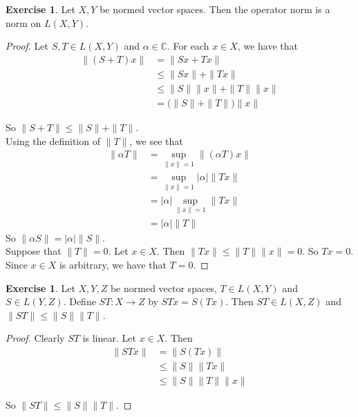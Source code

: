 \documentclass[12pt]{amsart}
\theoremstyle{definition}
\newtheorem{ex}[definition]{Exercise}
\newcommand{\al}{\alpha}
\newcommand{\C}{\mathbb{C}}
\newcommand{\lex}[1]{\label{ex:#1}}
\begin{document}
	\begin{ex} \lex{42008}
		Let $X, Y$ be normed vector spaces. Then the operator norm is a norm on $L(X,Y)$.
	\end{ex}
	
	\begin{proof}
		Let $S,T \in L(X,Y)$ and $\al \in \C$. For each $x \in X$, we have that 
		\begin{align*}
			\|(S+T)x \|
			&= \|Sx+Tx \|\\
			& \leq \|Sx \|+ \|Tx \|\\
			&\leq \|S \|\|x \|+ \|T \|\|x \|\\
			&= \big(\|S \|+ \|T \|\big) \|x \|
		\end{align*}
		
		So $\|S+T \|\leq \|S \|+ \|T \|$.\vspace{1cm}\\
		
		Using the definition of $\|T \|$, we see that 
		\begin{align*}
			\|\al T \|
			&= \sup_{\|x \|=1} \|(\al T)x \|\\
			&= \sup_{\|x \|=1} \vert \al \vert \|Tx \|\\
			&=\vert \al \vert \sup_{\|x \|=1} \|Tx \|\\
			&=\vert \al \vert \|T \|
		\end{align*} 
		So $\|\al S \|= \vert \al \vert \|S \|$. \vspace{1cm}\\ Suppose that $\|T \|= 0$. Let $x \in X$. Then $\|T x\|\leq \|T \|\|x \|= 0$. So $Tx=0$. Since $x \in X$ is arbitrary, we have that $T=0$. 
	\end{proof}
	
	\begin{ex} \lex{42009}
		Let $X,Y,Z$ be normed vector spaces, $T \in L(X,Y)$ and $S \in L(Y,Z)$. Define $ST:X \rightarrow Z$ by $STx = S(Tx)$. Then $ST \in L(X,Z)$ and $\|ST \|\leq \|S \|\|T \|$. 
	\end{ex}
	
	\begin{proof}
		Clearly $ST$ is linear. Let $x \in X$. Then 
		\begin{align*}
			\|ST x \|
			& = \|S(Tx) \|\\
			& \leq \|S \|\|Tx \|\\
			& \leq \|S \|\|T \|\|x \|
		\end{align*}
		
		So $\|ST \|\leq \|S \|\|T \|$.
	\end{proof}
	
\end{document}
